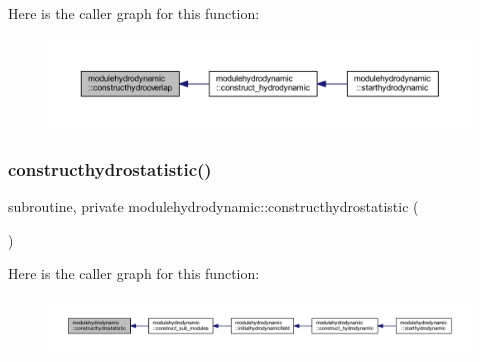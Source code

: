Here is the caller graph for this function\+:\nopagebreak
\begin{figure}[H]
\begin{center}
\leavevmode
\includegraphics[width=350pt]{namespacemodulehydrodynamic_a144fedbdcc486e7eda6dcae5d0b49d78_icgraph}
\end{center}
\end{figure}
\mbox{\label{namespacemodulehydrodynamic_a03c47a8a1c14b9e6471a24944ad9aae5}} 
\subsubsection{\texorpdfstring{constructhydrostatistic()}{constructhydrostatistic()}}
{\footnotesize\ttfamily subroutine, private modulehydrodynamic\+::constructhydrostatistic (\begin{DoxyParamCaption}{ }\end{DoxyParamCaption})\hspace{0.3cm}{\ttfamily [private]}}

Here is the caller graph for this function\+:\nopagebreak
\begin{figure}[H]
\begin{center}
\leavevmode
\includegraphics[width=350pt]{namespacemodulehydrodynamic_a03c47a8a1c14b9e6471a24944ad9aae5_icgraph}
\end{center}
\end{figure}
\mbox{\label{namespacemodulehydrodynamic_a25b15c0ef46c1b48f735915c9ffdd9c2}} 
